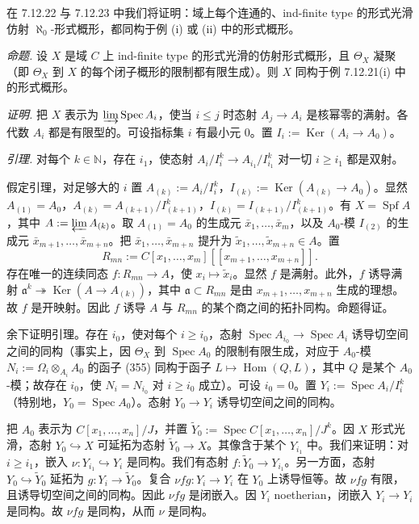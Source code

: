 在 7.12.22 与 7.12.23 中我们将证明：域上每个连通的、ind-finite type 的形式光滑仿射 $\aleph_0$-形式概形，都同构于例 (i) 或 (ii) 中的形式概形。


 \emph{命题.} 设 $X$ 是域 $C$ 上 ind-finite type 的形式光滑的仿射形式概形，且 $\Theta_X$ 凝聚（即 $\Theta_X$ 到 $X$ 的每个闭子概形的限制都有限生成）。则 $X$ 同构于例 7.12.21(i) 中的形式概形。

\emph{证明.} 把 $X$ 表示为 $\varinjlim\operatorname{Spec}A_i$，使当 $i\le j$ 时态射 $A_j\to A_i$ 是核幂零的满射。各代数 $A_i$ 都是有限型的。可设指标集 $i$ 有最小元 $0$。置 $I_i:=\operatorname{Ker}(A_i\to A_0)$。

\emph{引理.} 对每个 $k\in\mathbb{N}$，存在 $i_1$，使态射 $A_i/I_i^k\to A_{i_1}/I_{i_1}^k$ 对一切 $i\ge i_1$ 都是双射。

假定引理，对足够大的 $i$ 置 $A_{(k)}:=A_i/I_i^k$，$I_{(k)}:=\operatorname{Ker}(A_{(k)}\to A_0)$。显然 $A_{(1)}=A_0$，$A_{(k)}=A_{(k+1)}/I^k_{(k+1)}$，$I_{(k)}=I_{(k+1)}/I^k_{(k+1)}$。有 $X=\operatorname{Spf}A$，其中 $A:=\varprojlim A_{(k)}$。取 $A_{(1)}=A_0$ 的生成元 $\bar x_1,\ldots,\bar x_m$，以及 $A_0$-模 $I_{(2)}$ 的生成元 $\bar x_{m+1},\ldots,\bar x_{m+n}$。把 $\bar x_1,\ldots,\bar x_{m+n}$ 提升为 $\tilde x_1,\ldots,\tilde x_{m+n}\in A$。置
\[
R_{mn}:=C[x_1,\ldots,x_m][[x_{m+1},\ldots,x_{m+n}]].
\]
存在唯一的连续同态 $f:R_{mn}\to A$，使 $x_i\mapsto\tilde x_i$。显然 $f$ 是满射。此外，$f$ 诱导满射 $\mathfrak{a}^k\twoheadrightarrow\operatorname{Ker}(A\to A_{(k)})$，其中 $\mathfrak{a}\subset R_{mn}$ 是由 $x_{m+1},\ldots,x_{m+n}$ 生成的理想。故 $f$ 是开映射。因此 $f$ 诱导 $A$ 与 $R_{mn}$ 的某个商之间的拓扑同构。命题得证。

余下证明引理。存在 $i_0$，使对每个 $i\ge i_0$，态射 $\operatorname{Spec}A_{i_0}\to\operatorname{Spec}A_i$ 诱导切空间之间的同构（事实上，因 $\Theta_X$ 到 $\operatorname{Spec}A_0$ 的限制有限生成，对应于 $A_0$-模 $N_i:=\Omega_i\otimes_{A_i}A_0$ 的函子 (355) 同构于函子 $L\mapsto\operatorname{Hom}(Q,L)$，其中 $Q$ 是某个 $A_0$-模；故存在 $i_0$，使 $N_i=N_{i_0}$ 对 $i\ge i_0$ 成立）。可设 $i_0=0$。置 $Y_i:=\operatorname{Spec}A_i/I_i^k$（特别地，$Y_0=\operatorname{Spec}A_0$）。态射 $Y_0\to Y_i$ 诱导切空间之间的同构。


把 $A_0$ 表示为 $C[x_1,\ldots,x_n]/J$，并置 $\tilde Y_0:=\operatorname{Spec}C[x_1,\ldots,x_n]/J^k$。因 $X$ 形式光滑，态射 $Y_0\hookrightarrow X$ 可延拓为态射 $\tilde Y_0\to X$。其像含于某个 $Y_{i_1}$ 中。我们来证明：对 $i\ge i_1$，嵌入 $\nu:Y_{i_1}\hookrightarrow Y_i$ 是同构。我们有态射 $f:\tilde Y_0\to Y_{i_1}$。另一方面，态射 $Y_0\hookrightarrow\tilde Y_0$ 延拓为 $g:Y_i\to\tilde Y_0$。复合 $\nu fg:Y_i\to Y_i$ 在 $Y_0$ 上诱导恒等。故 $\nu fg$ 有限，且诱导切空间之间的同构。因此 $\nu fg$ 是闭嵌入。因 $Y_i$ noetherian，闭嵌入 $Y_i\to Y_i$ 是同构。故 $\nu fg$ 是同构，从而 $\nu$ 是同构。

